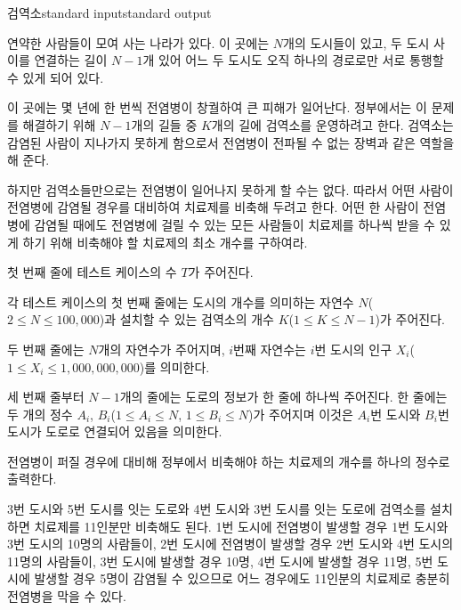 \begin{problem}{검역소}{standard input}{standard output}

연약한 사람들이 모여 사는 나라가 있다. 이 곳에는 $N$개의 도시들이 있고, 두 도시 사이를 연결하는 길이 $N-1$개 있어 어느 두 도시도 오직 하나의 경로로만 서로 통행할 수 있게 되어 있다.

이 곳에는 몇 년에 한 번씩 전염병이 창궐하여 큰 피해가 일어난다. 정부에서는 이 문제를 해결하기 위해 $N-1$개의 길들 중 $K$개의 길에 검역소를 운영하려고 한다. 검역소는 감염된 사람이 지나가지 못하게 함으로서 전염병이 전파될 수 없는 장벽과 같은 역할을 해 준다.

하지만 검역소들만으로는 전염병이 일어나지 못하게 할 수는 없다. 따라서 어떤 사람이 전염병에 감염될 경우를 대비하여 치료제를 비축해 두려고 한다. 어떤 한 사람이 전염병에 감염될 때에도 전염병에 걸릴 수 있는 모든 사람들이 치료제를 하나씩 받을 수 있게 하기 위해 비축해야 할 치료제의 최소 개수를 구하여라.

\InputFile
첫 번째 줄에 테스트 케이스의 수 $T$가 주어진다.

각 테스트 케이스의 첫 번째 줄에는 도시의 개수를 의미하는 자연수 $N$($2 \le N \le 100,000$)과 설치할 수 있는 검역소의 개수 $K$($1 \le K \le N-1$)가 주어진다.

두 번째 줄에는 $N$개의 자연수가 주어지며, $i$번째 자연수는 $i$번 도시의 인구 $X_i$($1 \le X_i \le 1,000,000,000$)를 의미한다.

세 번째 줄부터 $N-1$개의 줄에는 도로의 정보가 한 줄에 하나씩 주어진다. 한 줄에는 두 개의 정수 $A_i$, $B_i$($1 \le A_i \le N$, $1 \le B_i \le N$)가 주어지며 이것은 $A_i$번 도시와 $B_i$번 도시가 도로로 연결되어 있음을 의미한다.

\OutputFile
전염병이 퍼질 경우에 대비해 정부에서 비축해야 하는 치료제의 개수를 하나의 정수로 출력한다.

\Example

\begin{example}
%
\end{example}

\Notes
3번 도시와 5번 도시를 잇는 도로와 4번 도시와 3번 도시를 잇는 도로에 검역소를 설치하면 치료제를 11인분만 비축해도 된다. 1번 도시에 전염병이 발생할 경우 1번 도시와 3번 도시의 10명의 사람들이, 2번 도시에 전염병이 발생할 경우 2번 도시와 4번 도시의 11명의 사람들이, 3번 도시에 발생할 경우 10명, 4번 도시에 발생할 경우 11명, 5번 도시에 발생할 경우 5명이 감염될 수 있으므로 어느 경우에도 11인분의 치료제로 충분히 전염병을 막을 수 있다.

\end{problem}

